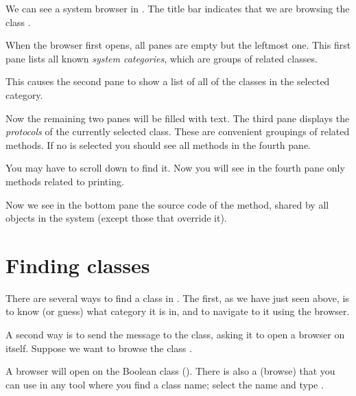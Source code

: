 \documentclass[a4paper,10pt,twoside]{book}
\begin{document}
We can see a system browser in .
The title bar indicates that we are browsing the class .

When the browser first opens, all panes are empty but the leftmost one.
This first pane lists all known \emph{system categories}, which are groups of related classes.

This causes the second pane to show a list of all of the classes in the selected category.

Now the remaining two panes will be filled with text.
The third pane displays the \emph{protocols} of the currently selected class.
These are convenient groupings of related methods.
If no  is selected you should see all methods in the fourth pane.

You may have to scroll down to find it.
Now you will see in the fourth pane only methods related to printing.

Now we see in the bottom pane the source code of the  method, shared by all objects in the system (except those that override it).

\section{Finding classes}

There are several ways to find a class in \sq.  The first, as we have just seen above, is to know (or guess) what category it is in, and to navigate to it using the browser.

A second way is to send the  message to the class, asking it to open a browser on itself.  Suppose we want to browse the class .

A browser will open on the Boolean class ().
There is also a   (browse) that you can use in any tool where you find a class name;
select the name and type .

\end{document}
